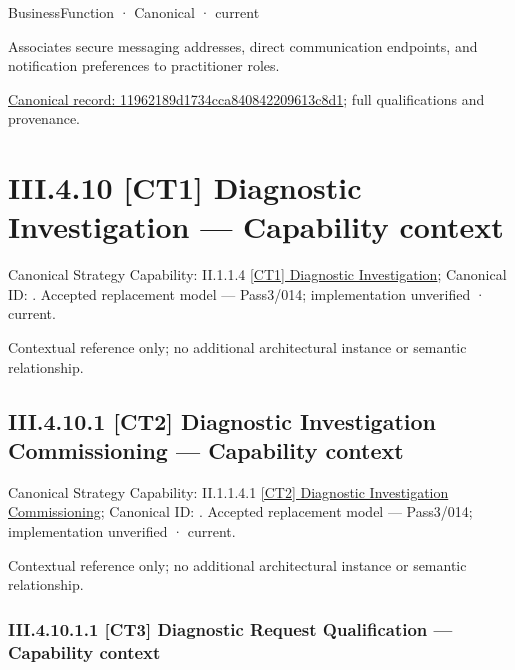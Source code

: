 \label{element:11962189d1734cca840842209613c8d1}
{\small BusinessFunction · Canonical · current}\par

Associates secure messaging addresses, direct communication endpoints, and notification preferences to practitioner roles.


{\footnotesize \href{../../../../../../../../continuum/business/business-function/11962189d1734cca840842209613c8d1.md}{Canonical record: 11962189d1734cca840842209613c8d1}; full qualifications and provenance.}\par
\section*{III.4.10 [CT1] Diagnostic Investigation — Capability context}
\label{navigation:III.4.10}

{\small Canonical Strategy Capability: II.1.1.4 \hyperref[element:56d099bca3af4d87813fd0a7742987ee]{[CT1] Diagnostic Investigation}; Canonical ID: \texttt{}. Accepted replacement model — Pass3/014; implementation unverified · current.}\par
Contextual reference only; no additional architectural instance or semantic relationship.\par
\subsection*{III.4.10.1 [CT2] Diagnostic Investigation Commissioning — Capability context}
\label{navigation:III.4.10.1}

{\small Canonical Strategy Capability: II.1.1.4.1 \hyperref[element:5072e49fdf4f4e8da7e928b56b390137]{[CT2] Diagnostic Investigation Commissioning}; Canonical ID: \texttt{}. Accepted replacement model — Pass3/014; implementation unverified · current.}\par
Contextual reference only; no additional architectural instance or semantic relationship.\par
\subsubsection*{III.4.10.1.1 [CT3] Diagnostic Request Qualification — Capability context}
\label{navigation:III.4.10.1.1}

